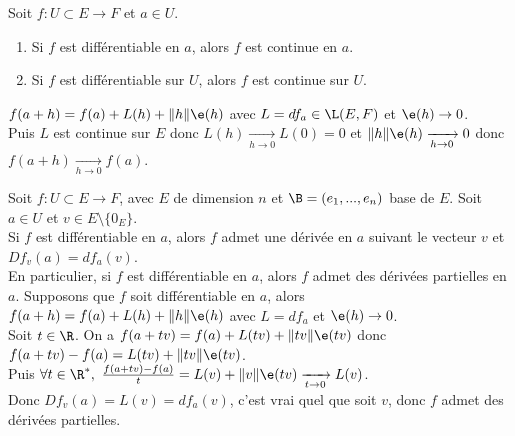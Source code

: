 \documentclass[11pt]{article}
\begin{document}
\begin{prop}{}{}
    Soit $f:U\subset E \to F$ et $a\in U$.
    \begin{enumerate}
        \item Si $f$ est différentiable en $a$, alors $f$ est continue en $a$.
        \item Si $f$ est différentiable sur $U$, alors $f$ est continue sur $U$.
    \end{enumerate}
    \tcblower
     $f(a+h)=f(a)+L(h)+\|h\|\e(h)$ avec $L=df_a\in\L(E,F)$ et $\e(h)\to0$.\\
    Puis $L$ est continue sur $E$ donc $L(h)\xrightarrow[h\to 0]{}L(0)=0$ et $\|h\|\e(h)\xrightarrow[h\to0]{}0$ donc $f(a+h)\xrightarrow[h\to0]{} f(a)$.
\end{prop}

\begin{prop}{}{}
    Soit $f:U\subset E\to F$, avec $E$ de dimension $n$ et $\B=(e_1,...,e_n)$ base de $E$. Soit $a\in U$ et $v\in E\setminus\{0_E\}$.\\
    Si $f$ est différentiable en $a$, alors $f$ admet une dérivée en $a$ suivant le vecteur $v$ et $Df_v(a)=df_a(v)$.\\
    En particulier, si $f$ est différentiable en $a$, alors $f$ admet des dérivées partielles en $a$.
    \tcblower
    Supposons que $f$ soit différentiable en $a$, alors $f(a+h)=f(a)+L(h)+\|h\|\e(h)$ avec $L=df_a$ et $\e(h)\to0$.\\
    Soit $t\in\R$. On a $f(a+tv)=f(a)+L(tv)+\|tv\|\e(tv)$ donc $f(a+tv)-f(a)=L(tv)+\|tv\|\e(tv)$.\\
    Puis $\forall t \in \R^*, ~ \frac{f(a+tv)-f(a)}{t}=L(v)+\|v\|\e(tv)\xrightarrow[t\to0]{} L(v)$.\\
    Donc $Df_v(a)=L(v)=df_a(v)$, c'est vrai quel que soit $v$, donc $f$ admet des dérivées partielles.
\end{prop}
\end{document}
